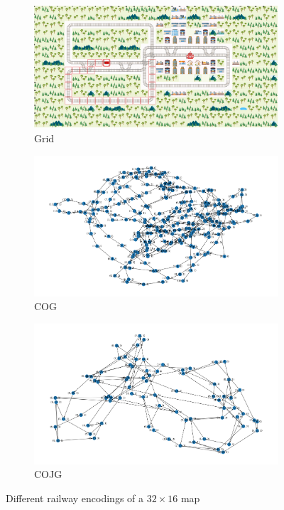 \documentclass[a4paper,10pt]{report}
\begin{document}
\begin{figure}[!h]
	\centering
	\captionsetup[subfigure]{justification=centering}
	\begin{subfigure}[b]{.8\linewidth}
		\includegraphics[width=\textwidth]{grid-env-32x16.png}
		\caption{Grid}
		\label{fig:grid-env-32x16}
	\end{subfigure}%

	\begin{subfigure}[b]{.8\linewidth}
		\includegraphics[width=\textwidth]{cog-env-32x16.png}
		\caption{COG}
		\label{fig:cog-env-32x16}
	\end{subfigure}%

	\begin{subfigure}[b]{.8\linewidth}
		\includegraphics[width=\textwidth]{cojg-env-32x16.png}
		\caption{COJG}
		\label{fig:cojg-env-32x16}
	\end{subfigure}%

	\caption{Different railway encodings of a $32\times 16$ map}
	\label{fig:grid-cog-cojg-32x16}
\end{figure}
\end{document}
